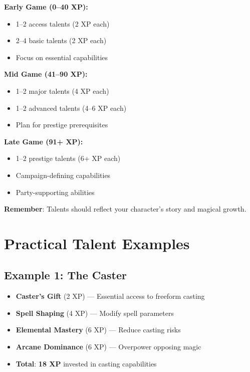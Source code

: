 \begin{tcolorbox}[colback=purple!5!white,colframe=purple!75!black,title=Talent Selection Guide,fonttitle=\bfseries]
\textbf{Early Game (0--40 XP):}
\begin{itemize}
\item 1--2 access talents (2 XP each)
\item 2--4 basic talents (2 XP each)
\item Focus on essential capabilities
\end{itemize}

\textbf{Mid Game (41--90 XP):}
\begin{itemize}
\item 1--2 major talents (4 XP each)
\item 1--2 advanced talents (4--6 XP each)
\item Plan for prestige prerequisites
\end{itemize}

\textbf{Late Game (91+ XP):}
\begin{itemize}
\item 1--2 prestige talents (6+ XP each)
\item Campaign-defining capabilities
\item Party-supporting abilities
\end{itemize}

\textbf{Remember}: Talents should reflect your character's story and magical growth.
\end{tcolorbox}

\section{Practical Talent Examples}

\subsection*{Example 1: The Caster}
\begin{itemize}
\item \textbf{Caster's Gift} (2 XP) --- Essential access to freeform casting
\item \textbf{Spell Shaping} (4 XP) --- Modify spell parameters
\item \textbf{Elemental Mastery} (6 XP) --- Reduce casting risks
\item \textbf{Arcane Dominance} (6 XP) --- Overpower opposing magic
\item \textbf{Total}: \textbf{18 XP} invested in casting capabilities
\end{itemize}

